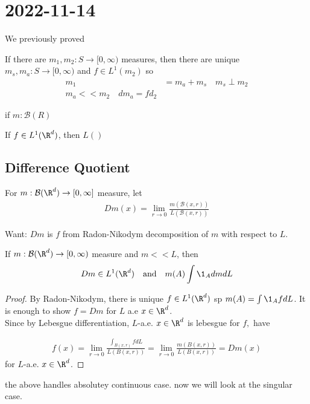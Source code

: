 \section{2022-11-14}

We previously proved 

\begin{theorem}
	If there are $m_1, m_2 : S \to [0, \infty)$ measures, then there are unique $m_s, m_a : S \to [0, \infty)$ and $f \in L^{1} (m_2)$ so
	\begin{align*}
		m_1 &= m_a + m_s \quad m_s \perp m_2 \\
		m_a << m_2 \quad d m_a = f d_2
	\end{align*} 

\end{theorem}


\begin{theorem}
		if $m : \mathcal{B}(R)$
\end{theorem}

\begin{theorem}
	If $f \in L^{1} (\R^d)$, then $L ()$
\end{theorem}

\subsection{Difference Quotient}

\begin{definition}
	For $m: \mathcal{B}(\R^d) \to [0, \infty]$ measure,
	let 
	\begin{align*}
		D m (x) = \lim_{r \to 0} \frac{m ( \mathcal{B} (x, r))}{L(\mathcal{B}(x, r))}
	\end{align*} 

	Want: $D m$ is $f$ from Radon-Nikodym decomposition of $m$ with respect to $L$.
\end{definition}

\begin{theorem}
	If $m: \mathcal{B}(\R^d) \to [0, \infty)$ measure and $m << L$, then 
	\begin{align*}
		D m \in L^{1} (\R^d) \quad \text{and} \quad m(A) \int \1_A dm dL
	\end{align*} 
\end{theorem}

\begin{proof}
	By Radon-Nikodym, there is unique $f \in L^1(\R^d)$ sp $m(A) = \int \1_A f dL$.
	It is enough to show  $f = D m$ for $L$ a.e $x \in \R^d$. \\

	Since  by Lebesgue differentiation, $L$-a.e. $x \in \R^d$ is lebesgue for $f,$ have

	\begin{align*}
		f(x) = \lim_{r \to 0} \frac{\int_{B(x, r)} f dL}{L(B(x,r))} = \lim_{r \to 0} \frac{m(B(x,r))}{L(B(x,r))} = D m(x)
	\end{align*} 
	for $L$-a.e. $x \in \R^d$.
\end{proof}

\begin{remark}
	the above handles absolutey continuous case. now we will  look at the singular case.
\end{remark}




